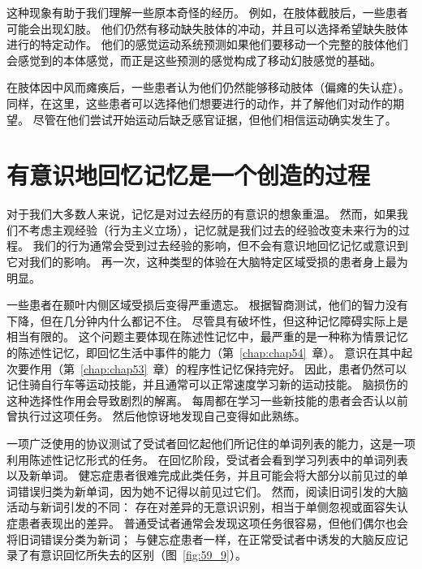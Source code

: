 这种现象有助于我们理解一些原本奇怪的经历。
例如，在肢体截肢后，一些患者可能会出现幻肢。
他们仍然有移动缺失肢体的冲动，并且可以选择希望缺失肢体进行的特定动作。
他们的感觉运动系统预测如果他们要移动一个完整的肢体他们会感觉到的本体感觉，而正是这些预测的感觉构成了移动幻肢感觉的基础。


在肢体因中风而瘫痪后，一些患者认为他们仍然能够移动肢体（偏瘫的失认症）。
同样，在这里，这些患者可以选择他们想要进行的动作，并了解他们对动作的期望。
尽管在他们尝试开始运动后缺乏感官证据，但他们相信运动确实发生了。



\section{有意识地回忆记忆是一个创造的过程}

对于我们大多数人来说，记忆是对过去经历的有意识的想象重温。
然而，如果我们不考虑主观经验（行为主义立场），记忆就是我们过去的经验改变未来行为的过程。
我们的行为通常会受到过去经验的影响，但不会有意识地回忆记忆或意识到它对我们的影响。
再一次，这种类型的体验在大脑特定区域受损的患者身上最为明显。


一些患者在颞叶内侧区域受损后变得严重遗忘。
根据智商测试，他们的智力没有下降，但在几分钟内什么都记不住。
尽管具有破坏性，但这种记忆障碍实际上是相当有限的。
这个问题主要体现在陈述性记忆中，最严重的是一种称为情景记忆的陈述性记忆，即回忆生活中事件的能力（第~\ref{chap:chap54}~章）。
意识在其中起次要作用（第~\ref{chap:chap53}~章）的程序性记忆保持完好。
因此，患者仍然可以记住骑自行车等运动技能，并且通常可以正常速度学习新的运动技能。
脑损伤的这种选择性作用会导致剧烈的解离。
每周都在学习一些新技能的患者会否认以前曾执行过这项任务。
然后他惊讶地发现自己变得如此熟练。


一项广泛使用的协议测试了受试者回忆起他们所记住的单词列表的能力，这是一项利用陈述性记忆形式的任务。
在回忆阶段，受试者会看到学习列表中的单词列表以及新单词。
健忘症患者很难完成此类任务，并且可能会将大部分以前见过的单词错误归类为新单词，因为她不记得以前见过它们。
然而，阅读旧词引发的大脑活动与新词引发的不同：
存在对差异的无意识识别，相当于单侧忽视或面容失认症患者表现出的差异。
普通受试者通常会发现这项任务很容易，但他们偶尔也会将旧词错误分类为新词；
与健忘症患者一样，在正常受试者中诱发的大脑反应记录了有意识回忆所失去的区别（图~\ref{fig:59_9}）。


